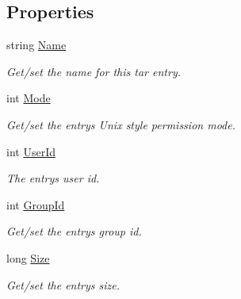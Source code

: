 \subsection*{Properties}
\begin{DoxyCompactItemize}
\item 
string \hyperlink{class_i_c_sharp_code_1_1_sharp_zip_lib_1_1_tar_1_1_tar_header_a9cd7dea1e6ca90703b1a4cb9e99981ff}{Name}
\begin{DoxyCompactList}\small\item\em Get/set the name for this tar entry. \end{DoxyCompactList}\item 
int \hyperlink{class_i_c_sharp_code_1_1_sharp_zip_lib_1_1_tar_1_1_tar_header_af0e9ad5ce1bcac4bc49aa0f26f8f2513}{Mode}
\begin{DoxyCompactList}\small\item\em Get/set the entry\textquotesingle{}s Unix style permission mode. \end{DoxyCompactList}\item 
int \hyperlink{class_i_c_sharp_code_1_1_sharp_zip_lib_1_1_tar_1_1_tar_header_a1e5636ba90c2b7ec3d61336501e3c048}{User\+Id}
\begin{DoxyCompactList}\small\item\em The entry\textquotesingle{}s user id. \end{DoxyCompactList}\item 
int \hyperlink{class_i_c_sharp_code_1_1_sharp_zip_lib_1_1_tar_1_1_tar_header_a0a669ee68fd43fcc0f0eb30e6e64fb5d}{Group\+Id}
\begin{DoxyCompactList}\small\item\em Get/set the entry\textquotesingle{}s group id. \end{DoxyCompactList}\item 
long \hyperlink{class_i_c_sharp_code_1_1_sharp_zip_lib_1_1_tar_1_1_tar_header_a9c473eb1f8bc65ee9ed118648cf5a926}{Size}
\begin{DoxyCompactList}\small\item\em Get/set the entry\textquotesingle{}s size. \end{DoxyCompactList}\item 

\end{DoxyCompactItemize}
